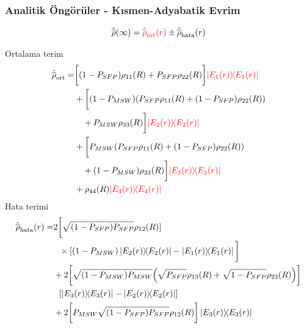 \documentclass[10pt]{beamer}
\begin{document}
\begin{frame}
    \frametitle{Analitik Öngörüler - Kısmen-Adyabatik Evrim}
    \hrulefill
    \tiny

    \begin{equation*}
        \hat{\overline{\rho}}(\infty) = {\color{red}\hat{\overline{\rho}}_{\text{ort}}(r)} \pm \hat{\overline{\rho}}_{\text{hata}}(r)
    \end{equation*}
    \normalsize
    \hrulefill

    Ortalama terim
    \tiny
    \begin{align*}
        \hat{\overline{\rho}}_{\text{ort}}=& \bigg[(1-P_{SFP}) \rho_{11}(R)+ P_{SFP} \rho_{22}(R)\bigg] {\color{red}\dyad{E_{1}(r)}{E_{1}(r)}}\\
        &+ \bigg[\qty(1-P_{MSW})\qty(P_{SFP}\rho_{11}(R) +(1-P_{SFP})\rho_{22}(R))\\
        &~~~+ P_{MSW} \rho_{33}(R)\bigg] {\color{red}\dyad{E_{2}(r)}{E_{2}(r)}}\\
        &+ \bigg[P_{MSW}\qty(P_{SFP}\rho_{11}(R)+ (1-P_{SFP})\rho_{22}(R))\\
        &~~~+(1-P_{MSW})\rho_{33}(R)\bigg] {\color{red}\dyad{E_{3}(r)}{E_{3}(r)}}\\
    &+ \rho_{44}(R) {\color{red}\dyad{E_{4}(r)}{E_{4}(r)}}
    \end{align*}
    \normalsize
    \color{lightgray}
    Hata terimi
    \tiny
    \begin{align*}
        \hat{\overline{\rho}}_{\text{hata}}(r)=&2\bigg[\sqrt{(1-P_{SFP}) P_{SFP}}\rho_{12}(R)]\\
    &~~\times[(1-P_{MSW})\dyad{E_{2}(r)}{E_{2}(r)} -\dyad{E_{1}(r)}{E_{1}(r)}\bigg]\\
    &+ 2\bigg[\sqrt{(1-P_{MSW})P_{MSW}}\qty(\sqrt{P_{SFP}}\rho_{13}(R)+\sqrt{1-P_{SFP}}\rho_{23}(R))\bigg]\\ & ~~\qty[\dyad{E_{3}(r)}{E_{3}(r)} - \dyad{E_{2}(r)}{E_{2}(r)}]\\
    &+ 2 \bigg[P_{MSW}\sqrt{(1-P_{SFP}) P_{SFP}} \rho_{12}(R)\bigg]\dyad{E_{3}(r)}{E_{3}(r)}
    \end{align*}
    \normalsize
\end{frame}
\end{document}
